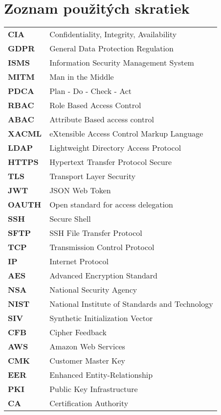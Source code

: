\thispagestyle{plain}

\section*{\Huge Zoznam použitých skratiek}
\vskip 1cm

\begin{tabular}{ >{\bfseries}m{2cm} m{10cm} }
CIA		& Confidentiality, Integrity, Availability \\
GDPR    & General Data Protection Regulation \\
ISMS    & Information Security Management System \\
MITM    & Man in the Middle\\
PDCA    & Plan - Do - Check - Act\\
RBAC    & Role Based Access Control\\
ABAC    & Attribute Based access control\\
XACML   & eXtensible Access Control Markup Language\\
LDAP    & Lightweight Directory Access Protocol\\
HTTPS   & Hypertext Transfer Protocol Secure\\
TLS     & Transport Layer Security\\
JWT     & JSON Web Token\\
OAUTH   & Open standard for access delegation\\
SSH     & Secure Shell\\
SFTP    & SSH File Transfer Protocol\\
TCP     & Transmission Control Protocol\\
IP      & Internet Protocol\\
AES     & Advanced Encryption Standard\\
NSA     & National Security Agency\\
NIST    & National Institute of Standards and Technology\\
SIV     & Synthetic Initialization Vector\\
CFB     & Cipher Feedback\\
AWS     & Amazon Web Services\\
CMK     & Customer Master Key\\
EER     & Enhanced Entity-Relationship\\
PKI     & Public Key Infrastructure\\
CA      & Certification Authority\\
\end{tabular}

\emptypage
